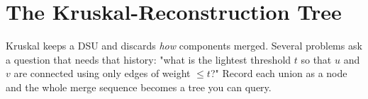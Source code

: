 \section{The Kruskal-Reconstruction Tree}\label{sec:c17-krt}

\begin{previouslybox}
Kruskal keeps a DSU and discards \emph{how} components merged.  Several problems
ask a question that needs that history: "what is the lightest threshold \(t\) so
that \(u\) and \(v\) are connected using only edges of weight \(\le t\)?"  Record
each union as a node and the whole merge sequence becomes a tree you can query.
\end{previouslybox}

